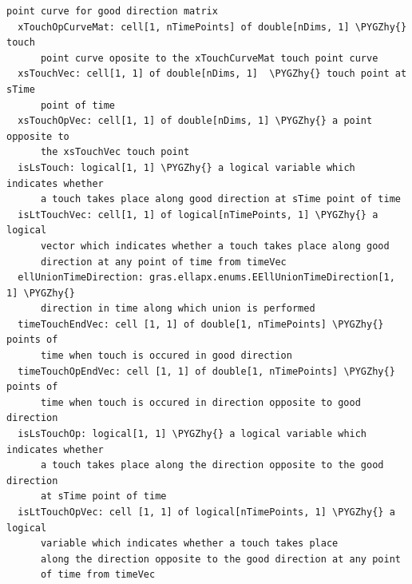 \documentclass[letterpaper,10pt,english]{sphinxmanual}
\def\PYGZhy{\char`\-}
\begin{document}
\begin{Verbatim}[commandchars=\\\{\}]
      point curve for good direction matrix
  xTouchOpCurveMat: cell[1, nTimePoints] of double[nDims, 1] \PYGZhy{} touch
      point curve oposite to the xTouchCurveMat touch point curve
  xsTouchVec: cell[1, 1] of double[nDims, 1]  \PYGZhy{} touch point at sTime
      point of time
  xsTouchOpVec: cell[1, 1] of double[nDims, 1] \PYGZhy{} a point opposite to
      the xsTouchVec touch point
  isLsTouch: logical[1, 1] \PYGZhy{} a logical variable which indicates whether
      a touch takes place along good direction at sTime point of time
  isLtTouchVec: cell[1, 1] of logical[nTimePoints, 1] \PYGZhy{} a logical
      vector which indicates whether a touch takes place along good
      direction at any point of time from timeVec
  ellUnionTimeDirection: gras.ellapx.enums.EEllUnionTimeDirection[1, 1] \PYGZhy{}
      direction in time along which union is performed
  timeTouchEndVec: cell [1, 1] of double[1, nTimePoints] \PYGZhy{} points of
      time when touch is occured in good direction
  timeTouchOpEndVec: cell [1, 1] of double[1, nTimePoints] \PYGZhy{} points of
      time when touch is occured in direction opposite to good direction
  isLsTouchOp: logical[1, 1] \PYGZhy{} a logical variable which indicates whether
      a touch takes place along the direction opposite to the good direction
      at sTime point of time
  isLtTouchOpVec: cell [1, 1] of logical[nTimePoints, 1] \PYGZhy{} a logical
      variable which indicates whether a touch takes place
      along the direction opposite to the good direction at any point
      of time from timeVec
\end{Verbatim}
\end{document}
